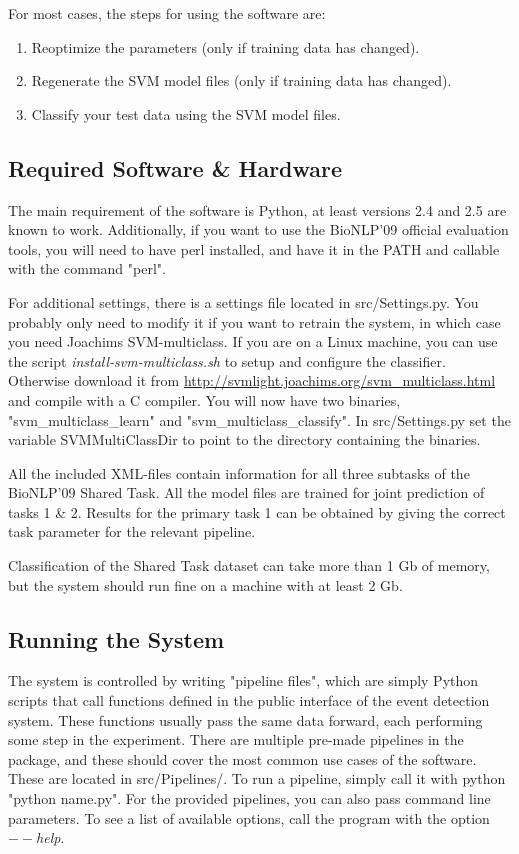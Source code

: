 \documentclass[a4paper,12pt]{article}
\begin{document}
For most cases, the steps for using the software are:

\begin{enumerate}
  \item Reoptimize the parameters (only if training data has changed).
  \item Regenerate the SVM model files (only if training data has changed).
  \item Classify your test data using the SVM model files.
\end{enumerate}

\subsection{Required Software \& Hardware}
\label{sec-requirements}

The main requirement of the software is Python, at least versions 2.4 and 2.5 are
known to work. Additionally, if you want to use the BioNLP'09 official evaluation
tools, you will need to have perl installed, and have it in the PATH and callable
with the command "perl".

For additional settings, there is a settings file located in src/Settings.py. You
probably only need to modify it if you want to retrain the system, in which case
you need Joachims SVM-multiclass. If you are on a Linux machine, you can
use the script \emph{install-svm-multiclass.sh} to setup and configure the
classifier. Otherwise download it from \url{http://svmlight.joachims.org/svm\_multiclass.html} and
compile with a C compiler. You will now have two binaries,
"svm\_multiclass\_learn" and "svm\_multiclass\_classify". In src/Settings.py set
the variable SVMMultiClassDir to point to the directory containing the binaries.

All the included XML-files contain information for all three subtasks of the
BioNLP'09 Shared Task. All the model files are trained for joint prediction of
tasks 1 \& 2. Results for the primary task 1 can be obtained by giving the
correct task parameter for the relevant pipeline.

Classification of the Shared Task dataset can take more than 1 Gb of memory, but
the system should run fine on a machine with at least 2 Gb.

\subsection{Running the System}
\label{sec-running}

The system is controlled by writing "pipeline files", which are simply Python
scripts that call functions defined in the public interface of the event
detection system. These functions usually pass the same data forward, each
performing some step in the experiment. There are multiple pre-made pipelines in
the package, and these should cover the most common use cases of the software.
These are located in src/Pipelines/. To run a pipeline, simply call it with
python "python name.py". For the provided pipelines, you can also pass command
line parameters. To see a list of available options, call the program with the
option \emph{$--$help}.
\end{document}
